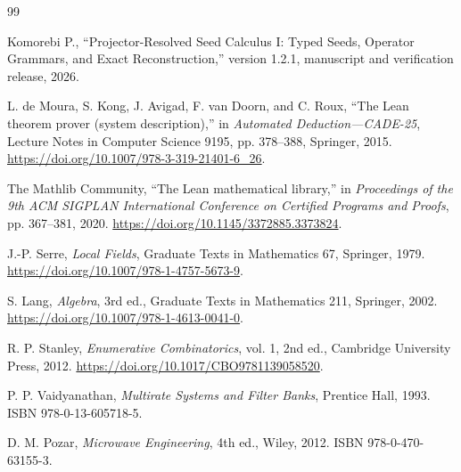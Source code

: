 \documentclass[11pt]{article}
\theoremstyle{definition}
\theoremstyle{remark}
\begin{document}
\begin{thebibliography}{99}

Komorebi P.,
``Projector-Resolved Seed Calculus I: Typed Seeds, Operator Grammars, and Exact
Reconstruction,'' version 1.2.1, manuscript and verification release, 2026.

L. de Moura, S. Kong, J. Avigad, F. van Doorn, and C. Roux,
``The Lean theorem prover (system description),'' in
\emph{Automated Deduction---CADE-25}, Lecture Notes in Computer Science 9195,
pp. 378--388, Springer, 2015.
\url{https://doi.org/10.1007/978-3-319-21401-6_26}.

The Mathlib Community,
``The Lean mathematical library,'' in
\emph{Proceedings of the 9th ACM SIGPLAN International Conference on
Certified Programs and Proofs}, pp. 367--381, 2020.
\url{https://doi.org/10.1145/3372885.3373824}.

J.-P. Serre, \emph{Local Fields}, Graduate Texts in Mathematics 67,
Springer, 1979.
\url{https://doi.org/10.1007/978-1-4757-5673-9}.

S. Lang, \emph{Algebra}, 3rd ed., Graduate Texts in Mathematics 211,
Springer, 2002.
\url{https://doi.org/10.1007/978-1-4613-0041-0}.

R. P. Stanley, \emph{Enumerative Combinatorics}, vol. 1, 2nd ed.,
Cambridge University Press, 2012.
\url{https://doi.org/10.1017/CBO9781139058520}.

P. P. Vaidyanathan, \emph{Multirate Systems and Filter Banks},
Prentice Hall, 1993. ISBN 978-0-13-605718-5.

D. M. Pozar, \emph{Microwave Engineering}, 4th ed., Wiley, 2012.
ISBN 978-0-470-63155-3.

\end{thebibliography}
\end{document}
